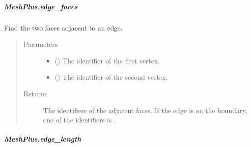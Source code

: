 \documentclass[letterpaper,10pt,english]{sphinxmanual}
\begin{document}
\begin{fulllineitems}
\begin{fulllineitems}
\begin{quote}
\begin{description}
\end{description}\end{quote}

\end{fulllineitems}



\subparagraph{MeshPlus.edge\_faces}
\label{\detokenize{api/generated/directional_clustering.mesh.MeshPlus.edge_faces:meshplus-edge-faces}}\label{\detokenize{api/generated/directional_clustering.mesh.MeshPlus.edge_faces::doc}}

\begin{fulllineitems}
\label{\detokenize{api/generated/directional_clustering.mesh.MeshPlus.edge_faces:directional_clustering.mesh.MeshPlus.edge_faces}}
Find the two faces adjacent to an edge.
\begin{quote}\begin{description}
\item[{Parameters}] \leavevmode\begin{itemize}
\item {} 
 () \textendash{} The identifier of the first vertex.

\item {} 
 () \textendash{} The identifier of the second vertex.

\end{itemize}

\item[{Returns}] \leavevmode
{} \textendash{} The identifiers of the adjacent faces.
If the edge is on the boundary, one of the identifiers is .

\end{description}\end{quote}

\end{fulllineitems}



\subparagraph{MeshPlus.edge\_length}
\label{\detokenize{api/generated/directional_clustering.mesh.MeshPlus.edge_length:meshplus-edge-length}}\label{\detokenize{api/generated/directional_clustering.mesh.MeshPlus.edge_length::doc}}


\end{fulllineitems}
\end{document}
